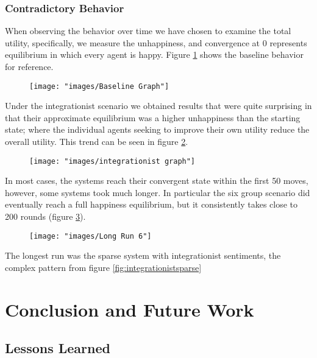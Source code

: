 \documentclass[sigplan,nonacm]{acmart}
\begin{document}
\subsubsection{Contradictory Behavior}

When observing the behavior over time we have chosen to examine the total utility, specifically,
we measure the unhappiness, and convergence at 0 represents equilibrium in which every agent is happy.
Figure \ref{fig:baseline-graph} shows the baseline behavior for reference.

\begin{figure}
	\centering
	\texttt{[image: "images/Baseline Graph"]}
	\caption{}
	\label{fig:baseline-graph}
\end{figure}


Under the integrationist scenario we obtained results that were quite surprising in that their approximate
equilibrium was a higher unhappiness than the starting state;
where the individual agents seeking to improve their own utility reduce the overall utility.
This trend can be seen in figure \ref{fig:integrationist-graph}.

\begin{figure}
	\centering
	\texttt{[image: "images/integrationist graph"]}
	\caption{}
	\label{fig:integrationist-graph}
\end{figure}

In most cases, the systems reach their convergent state within the first 50 moves, however, some systems took much longer.
In particular the six group scenario did eventually reach a full happiness equilibrium, but it consistently takes
close to 200 rounds (figure \ref{fig:long-run-6}).

\begin{figure}
	\centering
	\texttt{[image: "images/Long Run 6"]}
	\caption{}
	\label{fig:long-run-6}
\end{figure}

The longest run was the sparse system with integrationist sentiments, the complex pattern from figure \ref{fig:integrationistsparse} 


\section{Conclusion and Future Work}

\subsection{Lessons Learned}
\end{document}
